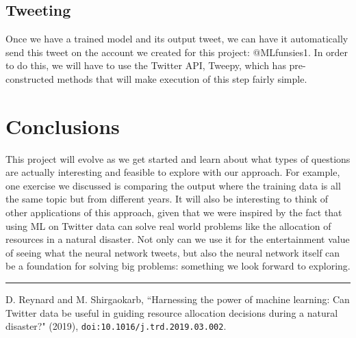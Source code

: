 \documentclass{article}
\begin{document}
\subsection{Tweeting}
Once we have a trained model and its output tweet, we can have it automatically send this tweet on the account we created for this project: @MLfunsies1. In order to do this, we will have to use the Twitter API, Tweepy, which has pre-constructed methods that will make execution of this step fairly simple.

\section{Conclusions}
This project will evolve as we get started and learn about what types of questions are actually interesting and feasible to explore with our approach. For example, one exercise we discussed is comparing the output where the training data is all the same topic but from different years. It will also be interesting to think of other applications of this approach, given that we were inspired by the fact that using ML on Twitter data can solve real world problems like the allocation of resources in a natural disaster. Not only can we use it for the entertainment value of seeing what the neural network tweets, but also the neural network itself can be a foundation for solving big problems: something we look forward to exploring.

\par\noindent\rule{\textwidth}{0.4pt}
\begingroup
\renewcommand{\section}[2]{}
\begin{thebibliography}{}
	D. Reynard and M. Shirgaokarb, 
	``Harnessing the power of machine learning: Can Twitter data be useful in guiding resource allocation decisions during a natural disaster?" (2019),
	\texttt{doi:10.1016/j.trd.2019.03.002}.
\end{thebibliography}
\endgroup
\end{document}
